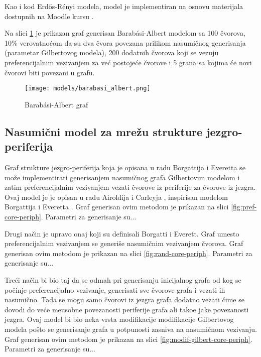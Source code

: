 \documentclass[11pt,a4paper]{article}
\begin{document}
Kao i kod Erd\H os-R\' enyi modela, model je implementiran na osnovu materijala dostupnih na Moodle kursu \cite{moodle}.

Na slici \ref{fig:barabasi-albert} je prikazan graf generisan Barab\' asi-Albert modelom sa 100 \v cvorova, 10\% verovatno\' com da su dva \v cvora povezana prilikom nasumi\v cnog generisanja (parametar Gilbertovog modela), 200 dodatnih \v cvorova koji se vezuju preferencijalnim vezivanjem za ve\' c postoje\' ce \v cvorove i 5 grana sa kojima \' ce novi \v cvorovi biti povezani u grafu.

\begin{figure}[h!]
    \centering
    \texttt{[image: models/barabasi\_albert.png]}
    \caption{Barab\' asi-Albert graf}
    \label{fig:barabasi-albert}
\end{figure}

\subsection{Nasumi\v cni model za mre\v zu strukture jezgro-periferija}

Graf strukture jezgro-periferija koja je opisana u radu Borgattija i Everetta \cite{borgattieverett2000} se mo\v ze implementirati generisanjem nasumi\v cnog grafa Gilbertovim modelom i zatim preferencijalnim vezivanjem vezati \v cvorove iz periferije za \v cvorove iz jezgra. Ovaj model je je opisan u radu Airoldija i Carleyja \cite{airoldicarely2005}, inspirisan modelom Borgattija i Everetta \cite{borgattieverett2000}. Graf generisan ovim metodom je prikazan na slici \ref{fig:pref-core-periph}. Parametri za generisanje su...

Drugi na\v cin je upravo onaj koji su definisali Borgatti i Everett. Graf umesto preferencijalnim vezivanjem se generi\v se nasumi\v cnim vezivanjem \v cvorova. Graf generisan ovim metodom je prikazan na slici \ref{fig:rand-core-periph}. Parametri za generisanje su...

Tre\' ci na\v cin bi bio taj da se odmah pri generisanju inicijalnog grafa od kog se po\v cinje preferencijalno vezivanje, generisati sve \v cvorove grafa i vezati ih nasumi\v cno. Tada se mogu samo \v cvorovi iz jezgra grafa dodatno vezati \v cime se dovodi do ve\' ce me\dj usobne povezanosti periferije grafa ali tako\dj e jake povezanosti jezgra. Ovaj model bi bio neka vrsta modifikacije modifikacije Gilbertovog modela po\v sto se generisanje grafa u potpunosti zasniva na nasumi\v cnom vezivanju. Graf generisan ovim metodom je prikazan na slici \ref{fig:modif-gilbert-core-periph}. Parametri za generisanje su...
\end{document}
